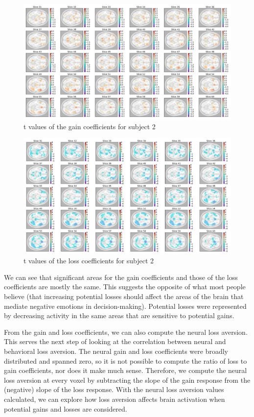 \documentclass[11pt]{article}
\begin{document}
\begin{figure}[H]
    \centering
      \includegraphics[scale=0.4]{figures/Regression2/t_gain_standard_sub2.png}
    \caption{t values of the gain coefficients for subject 2}
\end{figure}

\begin{figure}[H]
    \centering
      \includegraphics[scale=0.4]{figures/Regression2/t_loss_standard_sub2.png}
    \caption{t values of the loss coefficients for subject 2}
\end{figure}

We can see that significant areas for the gain coefficients and those of the 
loss coefficients are mostly the same. This suggests the opposite of what 
most people believe (that increasing potential losses should affect the areas 
of the brain that mediate negative emotions in decision-making). Potential 
losses were represented by decreasing activity in the same areas that are 
sensitive to potential gains.

From the gain and loss coefficients, we can also compute the neural loss
aversion. This serves the next step of looking at the correlation between
neural and behavioral loss aversion. The neural gain and loss coefficients
were broadly distributed and spanned zero, so it is not possible to compute
the ratio of loss to gain coefficients, nor does it make much sense.
Therefore, we compute the neural loss aversion at every voxel by subtracting
the slope of the gain response from the (negative) slope of the loss response.
With the neural loss aversion values calculated, we can explore how loss
aversion affects brain activation when potential gains and losses are
considered.
\end{document}
